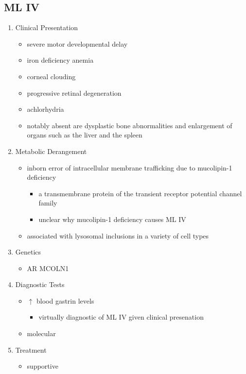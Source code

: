 \documentclass{scrartcl}
\begin{document}
\subsection{ML IV}
\label{sec:orge6b7a74}
\begin{enumerate}
\item Clinical Presentation
\label{sec:orga5ac151}
\begin{itemize}
\item severe motor developmental delay
\item iron deficiency anemia
\item corneal clouding
\item progressive retinal degeneration
\item achlorhydria
\end{itemize}
\begin{itemize}
\item notably absent are dysplastic bone abnormalities and enlargement of
organs such as the liver and the spleen
\end{itemize}

\item Metabolic Derangement
\label{sec:orgac77ccb}
\begin{itemize}
\item inborn error of intracellular membrane trafficking due to mucolipin-1 deficiency
\begin{itemize}
\item a transmembrane protein of the transient receptor potential channel family
\item unclear why  mucolipin-1 deficiency causes ML IV
\end{itemize}
\item associated with lysosomal inclusions in a variety of cell types
\end{itemize}
\item Genetics
\label{sec:orgeede267}
\begin{itemize}
\item AR MCOLN1
\end{itemize}
\item Diagnostic Tests
\label{sec:orgd6bffc9}
\begin{itemize}
\item \(\uparrow\) blood gastrin levels
\begin{itemize}
\item virtually diagnostic of ML IV given clinical presenation
\end{itemize}
\item molecular
\end{itemize}

\item Treatment
\label{sec:org058d5b4}
\begin{itemize}
\item supportive
\end{itemize}
\end{enumerate}
\end{document}
